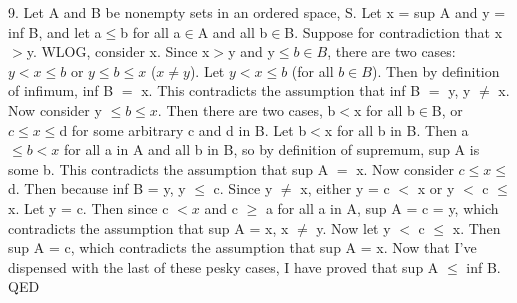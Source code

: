 \documentclass{article}
\begin{document}
9.  Let A and B be nonempty sets in an ordered space, S.  Let x = sup A and y = inf B, and let a$\leq$b for all a$\in$A and all b$\in$B.  Suppose for contradiction that x$>$y.  WLOG, consider x.  Since x$>$y and y$\leq b \in B$, there are two cases:  $y < x \leq b $ or $y \leq b \leq x$ ($x \neq y$).  Let $y < x \leq b$ (for all $b \in B$).  Then by definition of infimum, inf B $=$ x.  This contradicts the assumption that inf B $=$ y, y $\neq$ x.  Now consider y $\leq b \leq x$.  Then there are two cases, b$<$x for all b$\in$B, or $c \leq x \leq$d for some arbitrary c and d in B.  Let b$<$x for all b in B.  Then a$\leq b < x$ for all a in A and all b in B, so by definition of supremum, sup A is some b.  This contradicts the assumption that sup A $=$ x.  Now consider $c \leq x \leq$d.  Then because inf B = y, y $\leq$ c.  Since y $\neq$ x, either y = c $<$ x or y $<$ c $\leq$ x.  Let y = c.  Then since c $<x$ and c $\geq$ a for all a in A, sup A = c = y, which contradicts the assumption that sup A = x, x $\neq$ y.  Now let y $<$ c $\leq$ x.  Then sup A = c, which contradicts the assumption that sup A = x.  Now that I've dispensed with the last of these pesky cases, I have proved that sup A $\leq$ inf B. QED  \\ 
\end{document}
